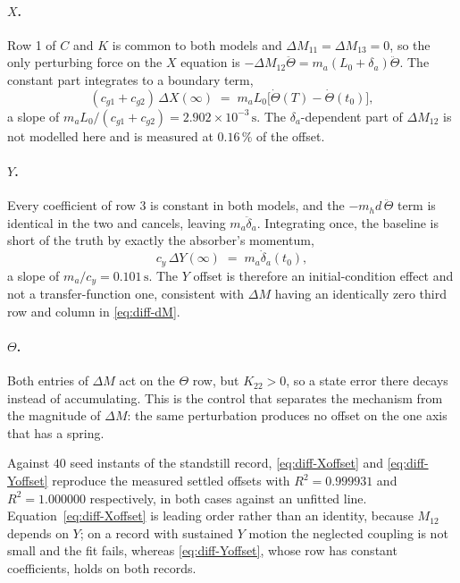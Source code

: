 \paragraph{$X$.} Row 1 of $C$ and $K$ is common to both models and
$\Delta M_{11} = \Delta M_{13} = 0$, so the only perturbing force on the $X$ equation is
$-\Delta M_{12}\ddot\Theta = m_a(L_0{+}\delta_a)\ddot\Theta$. The constant part integrates to a
boundary term,
%
\begin{equation}
  (c_{g1}{+}c_{g2})\,\Delta X(\infty)
  \;=\; m_a L_0 \bigl[\dot\Theta(T) - \dot\Theta(t_0)\bigr] ,
  \label{eq:diff-Xoffset}
\end{equation}
%
a slope of $m_a L_0/(c_{g1}{+}c_{g2}) = 2.902\times10^{-3}\,\mathrm{s}$. The
$\delta_a$-dependent part of $\Delta M_{12}$ is not modelled here and is measured at
$0.16\,\%$ of the offset.

\paragraph{$Y$.} Every coefficient of row 3 is constant in both models, and the
$-m_h d\,\ddot\Theta$ term is identical in the two and cancels, leaving $m_a\ddot\delta_a$.
Integrating once, the baseline is short of the truth by exactly the absorber's momentum,
%
\begin{equation}
  c_y\,\Delta Y(\infty) \;=\; m_a \dot\delta_a(t_0) ,
  \label{eq:diff-Yoffset}
\end{equation}
%
a slope of $m_a/c_y = 0.101\,\mathrm{s}$. The $Y$ offset is therefore an initial-condition
effect and not a transfer-function one, consistent with $\Delta M$ having an identically zero
third row and column in \eqref{eq:diff-dM}.

\paragraph{$\Theta$.} Both entries of $\Delta M$ act on the $\Theta$ row, but $K_{22} > 0$, so a
state error there decays instead of accumulating. This is the control that separates the
mechanism from the magnitude of $\Delta M$: the same perturbation produces no offset on the one
axis that has a spring.

Against $40$ seed instants of the standstill record, \eqref{eq:diff-Xoffset} and
\eqref{eq:diff-Yoffset} reproduce the measured settled offsets with $R^2 = 0.999931$ and
$R^2 = 1.000000$ respectively, in both cases against an unfitted line.
Equation~\eqref{eq:diff-Xoffset} is leading order rather than an identity, because $M_{12}$
depends on $Y$; on a record with sustained $Y$ motion the neglected coupling is not small and
the fit fails, whereas \eqref{eq:diff-Yoffset}, whose row has constant coefficients, holds on
both records.
